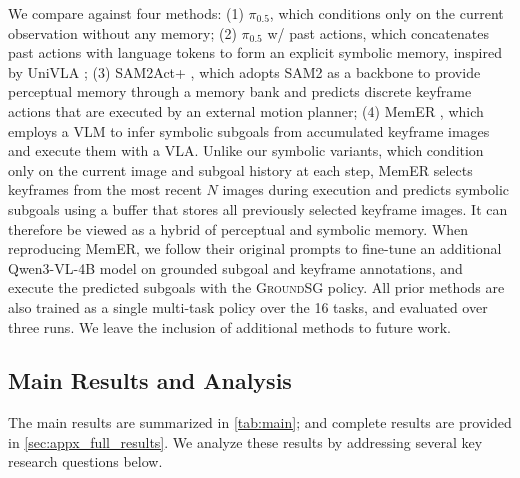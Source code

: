 We compare against four methods:
(1) $\pi_{0.5}$, which conditions only on the current observation without any memory;
(2) $\pi_{0.5}$ w/ past actions, which concatenates past actions with language tokens to form an explicit symbolic memory, inspired by UniVLA \cite{bu2025learning};
(3) SAM2Act+ \cite{fang2025sam2act}, which adopts SAM2 as a backbone to provide perceptual memory through a memory bank and predicts discrete keyframe actions that are executed by an external motion planner;
(4) MemER \cite{sridhar2025memer}, which employs a VLM to infer symbolic subgoals from accumulated keyframe images and execute them with a VLA.
Unlike our symbolic variants, which condition only on the current image and subgoal history at each step, MemER selects keyframes from the most recent $N$ images during execution and predicts symbolic subgoals using a buffer that stores all previously selected keyframe images. It can therefore be viewed as a hybrid of perceptual and symbolic memory. When reproducing MemER, we follow their original prompts to fine-tune an additional Qwen3-VL-4B model on grounded subgoal and keyframe annotations, and execute the predicted subgoals with the \textsc{GroundSG} policy.
All prior methods are also trained as a single multi-task policy over the 16 tasks, and evaluated over three runs. We leave the inclusion of additional methods to future work.


\subsection{Main Results and Analysis}





The main results are summarized in \cref{tab:main}; and complete results are provided in \cref{sec:appx_full_results}. We analyze these results by addressing several key research questions below.

